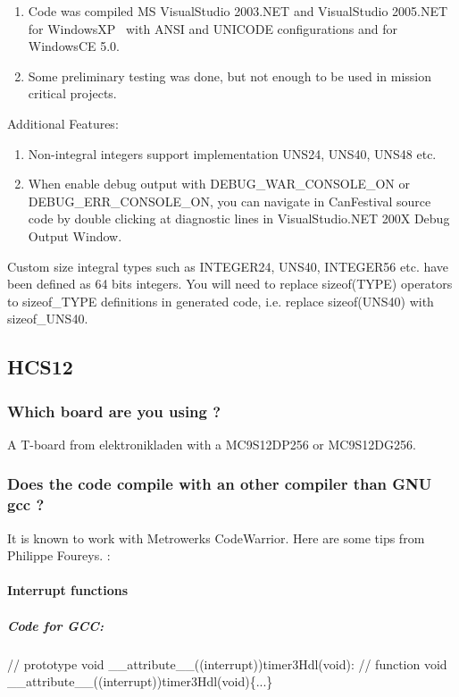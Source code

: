 \documentclass[12pt,twoside]{article}
\newcommand\liststyleLxi{%
\renewcommand\labelitemi{{--}}
\renewcommand\labelitemii{{--}}
\renewcommand\labelitemiii{{--}}
\renewcommand\labelitemiv{{--}}
}
\newcommand\liststyleLxii{%
\renewcommand\labelitemi{{--}}
\renewcommand\labelitemii{{--}}
\renewcommand\labelitemiii{{--}}
\renewcommand\labelitemiv{{--}}
}
\begin{document}
\liststyleLxi
\begin{enumerate}
\item Code was compiled MS VisualStudio 2003.NET and VisualStudio
2005.NET for WindowsXP \ with ANSI and UNICODE configurations and for
WindowsCE 5.0. 
\item Some preliminary testing was done, but not enough to be used in
mission critical projects.
\end{enumerate}
Additional Features:

\liststyleLxii
\begin{enumerate}
\item Non{}-integral integers support implementation UNS24, UNS40, UNS48
etc.
\item When enable debug output with DEBUG\_WAR\_CONSOLE\_ON or
DEBUG\_ERR\_CONSOLE\_ON, you can navigate in CanFestival source code by
double clicking at diagnostic lines in VisualStudio.NET 200X Debug
Output Window.
\end{enumerate}
Custom size integral types such as INTEGER24, UNS40, INTEGER56 etc. have
been defined as 64 bits integers. You will need to replace sizeof(TYPE)
operators to sizeof\_TYPE definitions in generated code, i.e. replace
sizeof(UNS40) with sizeof\_UNS40.


\bigskip

\subsection{HCS12}
\subsubsection{Which board are you using ?}
A T{}-board from elektronikladen with a MC9S12DP256 or MC9S12DG256.

\subsubsection{Does the code compile with an other compiler than GNU gcc
?}
It is known to work with Metrowerks CodeWarrior. Here are some tips from
Philippe Foureys. :

\paragraph{Interrupt functions}
\subparagraph{Code for GCC:}
{\ttfamily
 // prototype\newline
 void \_\_attribute\_\_((interrupt))timer3Hdl(void):\newline
 // function\newline
 void \_\_attribute\_\_((interrupt))timer3Hdl(void)\{...\}}
\end{document}
